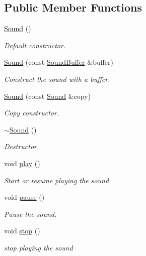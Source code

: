 \subsection*{Public Member Functions}
\begin{DoxyCompactItemize}
\item 
\mbox{\hyperlink{classsf_1_1_sound_a36ab74beaaa953d9879c933ddd246282}{Sound}} ()
\begin{DoxyCompactList}\small\item\em Default constructor. \end{DoxyCompactList}\item 
\mbox{\hyperlink{classsf_1_1_sound_a3b1cfc19a856d4ff8c079ee41bb78e69}{Sound}} (const \mbox{\hyperlink{classsf_1_1_sound_buffer}{Sound\+Buffer}} \&buffer)
\begin{DoxyCompactList}\small\item\em Construct the sound with a buffer. \end{DoxyCompactList}\item 
\mbox{\hyperlink{classsf_1_1_sound_ae05eeed6377932694d86b3011be366c0}{Sound}} (const \mbox{\hyperlink{classsf_1_1_sound}{Sound}} \&copy)
\begin{DoxyCompactList}\small\item\em Copy constructor. \end{DoxyCompactList}\item 
\mbox{\hyperlink{classsf_1_1_sound_ad0792c35310eba2dffd8489c80fad076}{$\sim$\+Sound}} ()
\begin{DoxyCompactList}\small\item\em Destructor. \end{DoxyCompactList}\item 
void \mbox{\hyperlink{classsf_1_1_sound_a2953ffe632536e72e696fd880ced2532}{play}} ()
\begin{DoxyCompactList}\small\item\em Start or resume playing the sound. \end{DoxyCompactList}\item 
void \mbox{\hyperlink{classsf_1_1_sound_a5eeb25815bfa8cdc4a6cc000b7b19ad5}{pause}} ()
\begin{DoxyCompactList}\small\item\em Pause the sound. \end{DoxyCompactList}\item 
void \mbox{\hyperlink{classsf_1_1_sound_aa9c91c34f7c6d344d5ee9b997511f754}{stop}} ()
\begin{DoxyCompactList}\small\item\em stop playing the sound \end{DoxyCompactList}\item 

\end{DoxyCompactItemize}
